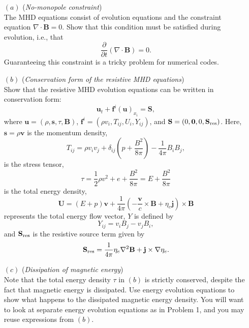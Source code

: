 \documentclass[letter,11pt]{article}
\begin{document}
\begin{itemize}
  	\item[$(a)$] (\emph{No-monopole constraint})\\
  		The MHD equations consist of evolution equations and the constraint equation $\nabla\cdot \mathbf{B}=0$. Show that this condition must be satisfied during evolution, i.e., that
  		\begin{equation} 
    		\frac{\partial}{\partial t}(\nabla\cdot\mathbf{B}) = 0.
		\end{equation}
		Guaranteeing this constraint is a tricky problem for numerical codes.

	\item[$(b)$] (\emph{Conservation form of the resistive MHD equations})\\
    	Show that the resistive MHD evolution equations can be written in conservation form:
   		\begin{equation}
      		\mathbf{u}_t + \mathbf{f}^i(\mathbf{u})_{x_i} = \mathbf{S}, \label{eq:Euler_prim}
    	\end{equation}
    	where $\mathbf{u}=(\rho, \mathbf{s}, \tau, \mathbf{B})$, $\mathbf{f}^i = (\rho v_i, T_{ij}, U_i, Y_{ij})$, and $\mathbf{S}= (0,\mathbf{0},0,\mathbf{S}_{\rm res})$. Here, $\mathbf{s}=\rho\mathbf{v}$ is the momentum density,
    	\begin{equation}
    		T_{ij} = \rho v_iv_j + \delta_{ij} \left(p + \frac{B^2}{8\pi}\right) - \frac{1}{4\pi}B_iB_j,
    	\end{equation}
    	is the stress tensor,
    	\begin{equation}
    		\tau = \frac{1}{2}\rho v^2 + e +  \frac{B^2}{8\pi} = E + \frac{B^2}{8\pi}
    	\end{equation}
    	is the total energy density,
    	\begin{equation}
    		\mathbf{U} = (E + p)\mathbf{v} + \frac{1}{4\pi}\left(-\frac{\mathbf{v}}{c}\times \mathbf{B} + \eta_e \mathbf{j}\right) \times \mathbf{B}
    	\end{equation}
    	represents the total energy flow vector, $Y$ is defined by
    	\begin{equation}
    		Y_{ij} = v_iB_j - v_j B_i,
    	\end{equation}
    	and $\mathbf{S}_{\rm res}$ is the resistive source term given by
    	\begin{equation}
    		\mathbf{S}_{\rm res} = \frac{1}{4\pi}\eta_e \nabla^2\mathbf{B} + \mathbf{j}\times \nabla \eta_e.
    	\end{equation}

    \item[$(c)$] (\emph{Dissipation of magnetic energy})\\
    	Note that the total energy density $\tau$ in $(b)$ is strictly conserved, despite the fact that magnetic energy is dissipated. Use energy evolution equations to show what happens to the dissipated magnetic energy density. You will want to look at separate energy evolution equations as in Problem 1, and you may reuse expressions from $(b)$.

\end{itemize}
\end{document}
